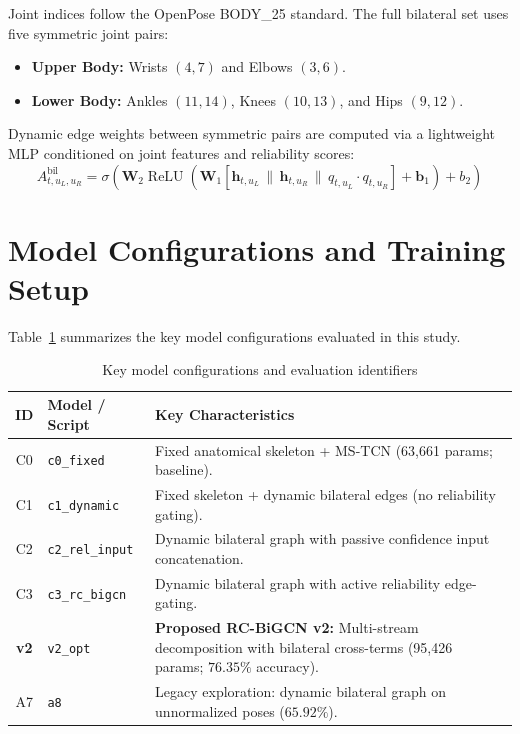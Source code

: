 Joint indices follow the OpenPose BODY\_25 standard. The full bilateral set uses five symmetric joint pairs:
\begin{itemize}
    \item \textbf{Upper Body:} Wrists \((4, 7)\) and Elbows \((3, 6)\).
    \item \textbf{Lower Body:} Ankles \((11, 14)\), Knees \((10, 13)\), and Hips \((9, 12)\).
\end{itemize}
Dynamic edge weights between symmetric pairs are computed via a lightweight MLP conditioned on joint features and reliability scores:
\begin{equation}
    A_{t, u_L, u_R}^{\text{bil}} = \sigma\left(\mathbf{W}_2 \operatorname{ReLU}\left(\mathbf{W}_1 [\mathbf{h}_{t, u_L} \,\|\, \mathbf{h}_{t, u_R} \,\|\, q_{t, u_L} \cdot q_{t, u_R}] + \mathbf{b}_1\right) + b_2\right)
\end{equation}

\section{Model Configurations and Training Setup}

Table~\ref{tab:reproduction-configurations} summarizes the key model configurations evaluated in this study.

\begin{table}[htbp]
\centering
\caption{Key model configurations and evaluation identifiers}
\label{tab:reproduction-configurations}
\small
\begin{tabular}{|c|l|p{7.5cm}|}
\hline
\textbf{ID} & \textbf{Model / Script} & \textbf{Key Characteristics} \\
\hline
C0 & \texttt{c0\_fixed} & Fixed anatomical skeleton + MS-TCN (63,661 params; baseline). \\
C1 & \texttt{c1\_dynamic} & Fixed skeleton + dynamic bilateral edges (no reliability gating). \\
C2 & \texttt{c2\_rel\_input} & Dynamic bilateral graph with passive confidence input concatenation. \\
C3 & \texttt{c3\_rc\_bigcn} & Dynamic bilateral graph with active reliability edge-gating. \\
\hline
\textbf{v2} & \texttt{v2\_opt} & \textbf{Proposed RC-BiGCN v2:} Multi-stream decomposition with bilateral cross-terms (95,426 params; $76.35\%$ accuracy). \\
\hline
A7 & \texttt{a8} & Legacy exploration: dynamic bilateral graph on unnormalized poses ($65.92\%$). \\
\hline
\end{tabular}
\end{table}

